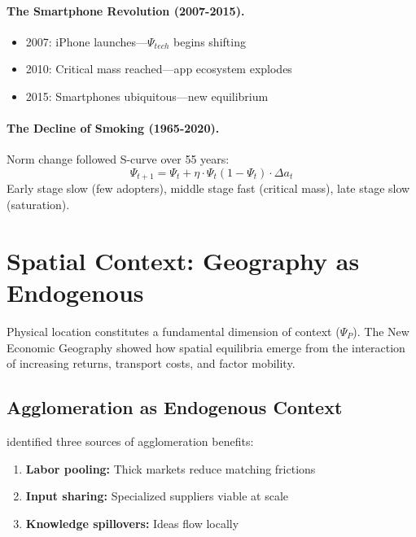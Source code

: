 \paragraph{The Smartphone Revolution (2007-2015).}
\begin{itemize}[nosep]
  \item 2007: iPhone launches---$\Psi_{tech}$ begins shifting
  \item 2010: Critical mass reached---app ecosystem explodes
  \item 2015: Smartphones ubiquitous---new equilibrium
\end{itemize}

\paragraph{The Decline of Smoking (1965-2020).}
Norm change followed S-curve over 55 years:
\begin{equation}
\Psi_{t+1} = \Psi_t + \eta \cdot \Psi_t (1 - \Psi_t) \cdot \Delta a_t
\label{eq:s-curve}
\end{equation}
Early stage slow (few adopters), middle stage fast (critical mass), late stage slow (saturation).



\section{Spatial Context: Geography as Endogenous}
\label{sec:context-spatial}


Physical location constitutes a fundamental dimension of context ($\Psi_P$).
The New Economic Geography \citep{krugman1991} showed how spatial equilibria
emerge from the interaction of increasing returns, transport costs, and factor mobility.

\subsection{Agglomeration as Endogenous Context}

\citet{marshall1890} identified three sources of agglomeration benefits:
\begin{enumerate}[nosep]
  \item \textbf{Labor pooling:} Thick markets reduce matching frictions
  \item \textbf{Input sharing:} Specialized suppliers viable at scale
  \item \textbf{Knowledge spillovers:} Ideas flow locally
\end{enumerate}

